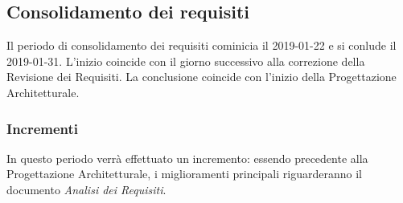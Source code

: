 \subsection{Consolidamento dei requisiti}
Il periodo di consolidamento dei requisiti cominicia il 2019-01-22 e si conlude il 2019-01-31. L'inizio coincide con il giorno successivo alla correzione della Revisione dei Requisiti. La conclusione coincide con l'inizio della Progettazione Architetturale. 
\subsubsection{Incrementi}
In questo periodo verrà effettuato un incremento: essendo precedente alla Progettazione Architetturale, i miglioramenti principali riguarderanno il documento \emph{Analisi dei Requisiti}.

\pagebreak